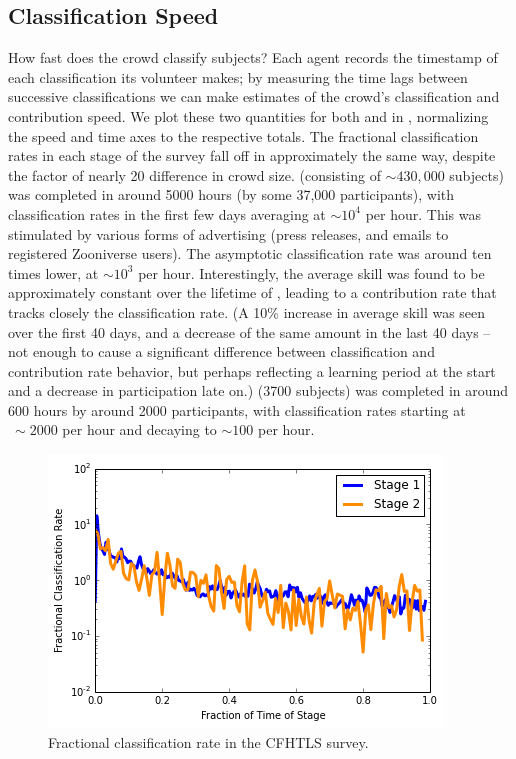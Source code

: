 \documentclass[useAMS,usenatbib,a4paper]{mn2e}
\begin{document}

\subsection{Classification Speed}
\label{sec:results:speed}

How fast does the \SW crowd classify subjects? Each agent records the timestamp
of each classification its volunteer makes; by measuring the time lags between
successive classifications we can make estimates of the crowd's classification
and contribution speed. We plot these two quantities for both \StageOne and
\StageTwo in , normalizing the speed and time axes to
the respective totals. The fractional classification rates in each stage of the
survey fall off in approximately the same way, despite the factor of nearly 20
difference in crowd size. \StageOne (consisting of $\sim430,000$ subjects) was
completed in around 5000 hours (by some 37,000 participants), with
classification rates in the first few days averaging at $\sim10^4$ per hour.
This was stimulated by various forms of advertising (press releases, and emails
to registered Zooniverse users). The asymptotic classification rate was  around
ten times lower, at $\sim10^3$ per hour. Interestingly, the average skill was
found to be approximately constant over the lifetime of \StageOne, leading to a
contribution rate that tracks closely the classification rate. (A 10\% increase
in average skill was seen over the first 40 days, and a decrease of the same
amount in the last 40 days -- not enough to cause a significant difference
between classification and contribution rate behavior, but perhaps reflecting a
learning period at the start and a decrease in participation late on.) \StageTwo
(3700 subjects) was completed in around 600 hours by around 2000 participants,
with classification rates starting at $~\sim2000$ per hour and decaying to
$\sim100$ per hour.

\begin{figure}
\centering\includegraphics[width=\linewidth]{sw-system-figs/rate_classification.png}
\caption{Fractional classification rate in the \SW CFHTLS survey.}
\label{fig:results:speed}
\end{figure}
\end{document}
